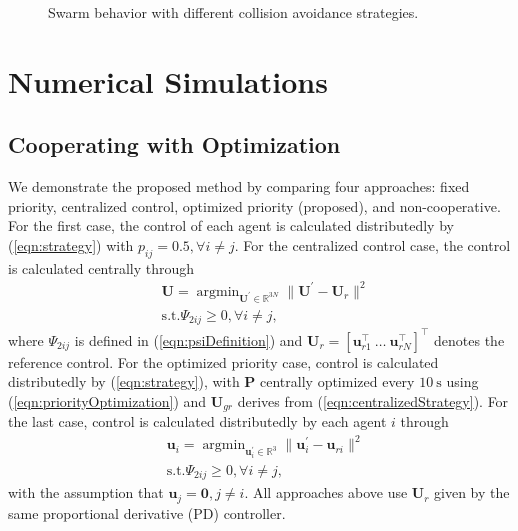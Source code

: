 \documentclass{ifacconf}
\begin{document}
\begin{figure}[t!]
   \caption{Swarm behavior with different collision avoidance strategies.}
   \label{fig:optexp}
\end{figure}

\section{Numerical Simulations}\label{sec:exp}

\subsection{Cooperating with Optimization}
\par We demonstrate the proposed method by comparing four approaches: fixed priority, centralized control, optimized priority (proposed), and non-cooperative.
For the first case, the control of each agent is calculated distributedly by (\ref{eqn:strategy}) with $p_{ij} = 0.5, \forall i \neq j$.
For the centralized control case, the control is calculated centrally through 
\begin{equation}\label{eqn:centralizedStrategy}
\begin{aligned}
      &\boldsymbol{U} = \mathop{\arg \min}_{\boldsymbol{U}^{\prime} \in \mathbb{R}^{3 N}} \| \boldsymbol{U}^\prime - \boldsymbol{U}_r\|^2 \\
      &\mathrm{s.t.}  \Psi_{2ij} \ge 0, \forall i \neq j,
\end{aligned}
\end{equation}
where $\Psi_{2ij}$ is defined in (\ref{eqn:psiDefinition}) and $\boldsymbol{U}_r = [\boldsymbol{u}_{r1}^{\top}~\dots~\boldsymbol{u}_{rN}^{\top}]^\top$ denotes the reference control.
For the optimized priority case, control is calculated distributedly by (\ref{eqn:strategy}), with $\boldsymbol{P}$ centrally optimized every $10~\mathrm{s}$ using (\ref{eqn:priorityOptimization}) and $\boldsymbol{U}_{gr}$ derives from (\ref{eqn:centralizedStrategy}).
For the last case, control is calculated distributedly by each agent $i$ through
\begin{equation}
\begin{aligned}
      & \boldsymbol{u}_i = \mathop{\arg \min}_{\boldsymbol{u}_i^{\prime} \in \mathbb{R}^{3}} \| \boldsymbol{u}_i^\prime - \boldsymbol{u}_{ri}\|^2 \\
      & \mathrm{s.t.}  \Psi_{2ij} \ge 0, \forall i \neq j,
\end{aligned}
\end{equation}
with the assumption that $\boldsymbol{u}_j = \boldsymbol{0}, j \neq i$.  
All approaches above use $\boldsymbol{U}_r$ given by the same proportional derivative (PD) controller.
\end{document}
